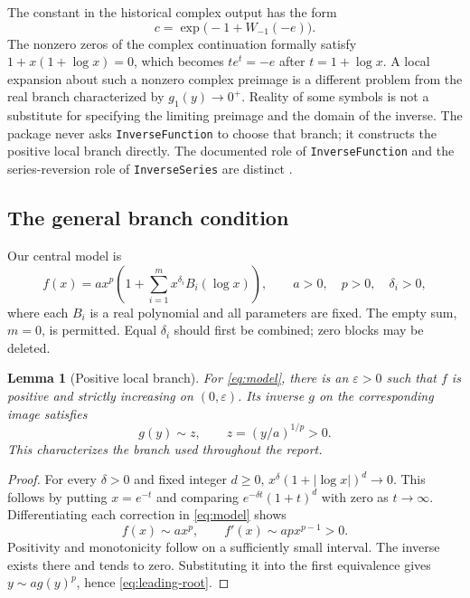 \documentclass[11pt,a4paper]{article}
\numberwithin{equation}{section}
\newtheorem{lemma}[theorem]{Lemma}
\theoremstyle{definition}
\theoremstyle{remark}
\begin{document}
The constant in the historical complex output has the form
\[
 c=\exp\bigl(-1+W_{-1}(-e)\bigr).
\]
The nonzero zeros of the complex continuation formally satisfy
$1+x(1+\log x)=0$, which becomes $t e^t=-e$ after $t=1+\log x$.
A local expansion about such a nonzero complex preimage is a different
problem from the real branch characterized by $g_1(y)\to0^+$. Reality of
some symbols is not a substitute for specifying the limiting preimage and
the domain of the inverse. The package never asks \texttt{InverseFunction}
to choose that branch; it constructs the positive local branch directly.
The documented role of \texttt{InverseFunction} and the series-reversion
role of \texttt{InverseSeries} are distinct \cite{wlinversefunction,wlinverseseries}.

\subsection{The general branch condition}

Our central model is
\begin{equation}
 f(x)=a x^p\left(1+\sum_{i=1}^{m}x^{\delta_i}B_i(\log x)\right),
 \qquad a>0,\quad p>0,\quad\delta_i>0,
 \label{eq:model}
\end{equation}
where each $B_i$ is a real polynomial and all parameters are fixed.
The empty sum, $m=0$, is permitted. Equal $\delta_i$ should first be
combined; zero blocks may be deleted.

\begin{lemma}[Positive local branch]
For \eqref{eq:model}, there is an $\varepsilon>0$ such that $f$ is positive
and strictly increasing on $(0,\varepsilon)$. Its inverse $g$ on the
corresponding image satisfies
\begin{equation}
 g(y)\sim z,\qquad z=(y/a)^{1/p}>0.
 \label{eq:leading-root}
\end{equation}
This characterizes the branch used throughout the report.
\end{lemma}
\begin{proof}
For every $\delta>0$ and fixed integer $d\ge0$,
$x^\delta(1+|\log x|)^d\to0$. This follows by putting $x=e^{-t}$ and
comparing $e^{-\delta t}(1+t)^d$ with zero as $t\to\infty$.
Differentiating each correction in \eqref{eq:model} shows
\[
 f(x)\sim a x^p,\qquad f'(x)\sim apx^{p-1}>0.
\]
Positivity and monotonicity follow on a sufficiently small interval.
The inverse exists there and tends to zero. Substituting it into the first
equivalence gives $y\sim a g(y)^p$, hence \eqref{eq:leading-root}.
\end{proof}
\end{document}

